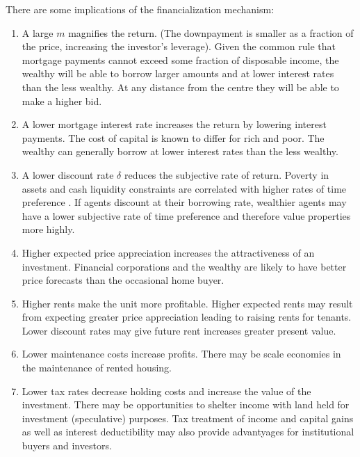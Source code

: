 There are some implications of the financialization mechanism:
\begin{enumerate}
\item A large $m$ magnifies the return. (The downpayment is smaller as a fraction of the price, increasing the investor's leverage). 
Given the  common rule that mortgage payments cannot exceed some fraction of disposable income, the wealthy will be able to borrow larger amounts and at lower interest rates than the less wealthy. At any distance from the centre they will be able to make a higher bid.

\item A lower mortgage interest rate increases the return by lowering interest payments. The cost of capital is known to differ for rich and poor.  The wealthy can generally borrow  at lower interest rates than the less wealthy. 

\item A lower discount rate $\delta$ reduces the subjective rate of return.  Poverty in assets and cash liquidity constraints are correlated with higher rates of time preference  \cite{carvalhoPovertyTimePreference2010}\cite{holdenPovertyMarketImperfections1998}. If agents discount at their borrowing rate, wealthier agents may have a lower subjective rate of time preference and therefore value properties more highly. 

\item Higher expected price appreciation increases the attractiveness of an investment. Financial corporations and the wealthy are likely to have better price forecasts than  the occasional home buyer.

\item Higher rents make the unit more profitable. Higher expected  rents may result from expecting greater price appreciation  leading to raising rents for tenants. Lower discount rates may give future rent increases greater present value.

\item Lower maintenance costs increase profits. There may be scale economies in the maintenance  of rented housing. 

\item Lower tax rates decrease holding costs and increase the value of the investment. There may be opportunities to shelter income with land held for investment (speculative) purposes. Tax treatment of income and capital gains as well as interest deductibility may also provide advantyages for institutional buyers and investors.%
\end{enumerate}


